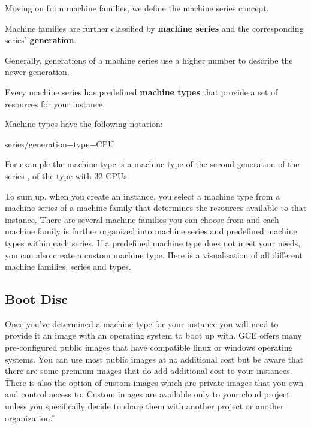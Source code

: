 Moving on from machine families, we define the machine series concept.

Machine families are further classified by \textbf{machine series} and the corresponding series' \textbf{generation}.
\ed

Generally, generations of a machine series use a higher number to describe the newer generation.

Every machine series has predefined \textbf{machine types} that provide a set of resources for your instance.
\ed

Machine types have the following notation:
\begin{bash}
series/generation$-$type$-$CPU
\end{bash}

\be
For example the machine type  is a machine type of the second generation of the series
, of the type  with 32 CPUs.
\ee

To sum up, when you create an instance, you select a machine type from a machine series of a machine family that
determines the resources available to that instance. There are several machine families you can choose from and each
machine family is further organized into machine series and predefined machine types within each series. If a
predefined machine type does not meet your needs, you can also create a custom machine type. \v

Here is a visualisation of all different machine families, series and types.


\subsection{Boot Disc}

Once you've determined a machine type for your instance you will need to provide it an image with an operating system
to boot up with. GCE offers many pre-configured public images that have compatible linux or windows operating systems.
You can use most public images at no additional cost but be aware that there are some premium images that do add
additional cost to your instances. \v

There is also the option of custom images which are private images that you own and control access to. Custom images
are available only to your cloud project unless you specifically decide to share them with another project or another
organization. \v

